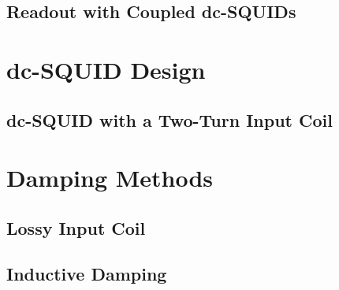 \subsection{Readout with Coupled dc-SQUIDs}

\section{dc-SQUID Design} \label{sec_SQUIDdesign}

\subsection{dc-SQUID with a Two-Turn Input Coil}


\section{Damping Methods} \label{sec_damping}

\subsection{Lossy Input Coil}

\subsection{Inductive Damping}